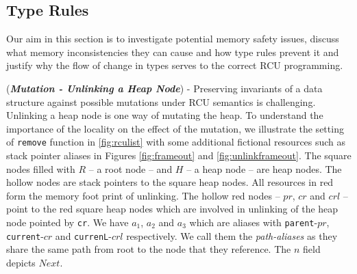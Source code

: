 \subsection{Type Rules}
\label{subsection:type-rules}
Our aim in this section is to investigate potential memory safety issues, discuss what memory inconsistencies they can cause and how type rules prevent it and justify why the flow of change in types serves to the correct \textsf{RCU} programming.

(\textit{\textbf{Mutation - Unlinking a Heap Node}}) - Preserving invariants of a data structure against possible mutations under \textsf{RCU} semantics is challenging. Unlinking a heap node is one way of mutating the heap. To understand the importance of the locality on the effect of the mutation, we illustrate the setting of \texttt{remove} function in \ref{fig:rculist} with some additional fictional resources such as stack pointer aliases in Figures  \ref{fig:frameout} and \ref{fig:unlinkframeout}. The square nodes filled with $R$ -- a root node -- and $H$ -- a heap node -- are heap nodes. The hollow nodes are stack pointers to the square heap nodes. All resources in red form the memory foot print of unlinking. The hollow red nodes -- $pr$, $cr$ and $crl$ -- point to the red square heap nodes which are involved in unlinking of the heap node pointed by \texttt{cr}. We have $a_1$, $a_2$ and $a_3$ which are aliases with \texttt{parent}-$pr$, \texttt{current}-$cr$ and \texttt{currenL}-$crl$ respectively. We call them the \textit{path-aliases} as they share the same path from root to the node that they reference. The $n$ field depicts $Next$.
